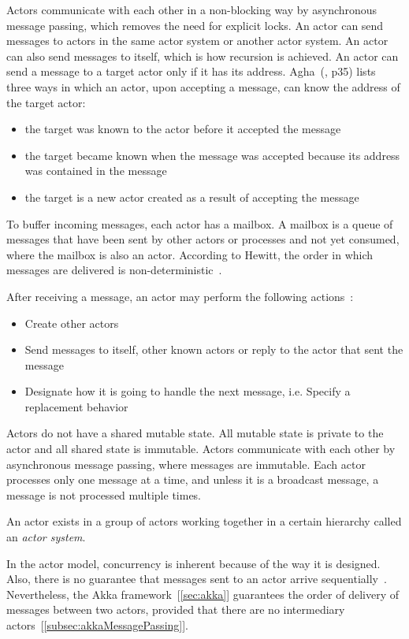   Actors communicate with each other in a non-blocking way by asynchronous message passing, which removes the need for explicit locks. An actor can send messages to actors in the same actor system or another actor system. An actor can also send messages to itself, which is how recursion is achieved. An actor can send a message to a target actor only if it has its address. Agha~(\cite{agha}, p35) lists three ways in which an actor, upon accepting a message, can know the address of the target actor:
  \begin{itemize}
    \item the target was known to the actor before it accepted the message
    \item the target became known when the message was accepted because its address was contained in the message
    \item the target is a new actor created as a result of accepting the message
  \end{itemize}

  To buffer incoming messages, each actor has a mailbox. A mailbox is a queue of messages that have been sent by other actors or processes and not yet consumed, where the mailbox is also an actor. According to Hewitt, the order in which messages are delivered is non-deterministic~\cite{hewittVideo}.

After receiving a message, an actor may perform the following actions~\cite{hewitt}:
\begin{itemize}
  \item Create other actors
  \item Send messages to itself, other known actors or reply to the actor that sent the message
  \item Designate how it is going to handle the next message, i.e. Specify a replacement behavior
\end{itemize}

  Actors do not have a shared mutable state. All mutable state is private to the actor and all shared state is immutable. Actors communicate with each other by asynchronous message passing, where messages are immutable. Each actor processes only one message at a time, and unless it is a broadcast message, a message is not processed multiple times.

  An actor exists in a group of actors working together in a certain hierarchy called an \emph{actor system}.

  In the actor model, concurrency is inherent because of the way it is designed. Also, there is no guarantee that messages sent to an actor arrive sequentially~\cite{hewittVideo}. Nevertheless, the Akka framework~[\autoref{sec:akka}] guarantees the order of delivery of messages between two actors, provided that there are no intermediary actors~[\autoref{subsec:akkaMessagePassing}].

